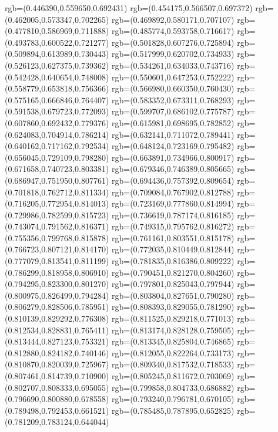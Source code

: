 {{{			rgb=(0.446390,0.559650,0.692431)
			rgb=(0.454175,0.566507,0.697372)
			rgb=(0.462005,0.573347,0.702265)
			rgb=(0.469892,0.580171,0.707107)
			rgb=(0.477810,0.586969,0.711888)
			rgb=(0.485774,0.593758,0.716617)
			rgb=(0.493783,0.600522,0.721277)
			rgb=(0.501828,0.607276,0.725894)
			rgb=(0.509894,0.613989,0.730443)
			rgb=(0.517999,0.620702,0.734933)
			rgb=(0.526123,0.627375,0.739362)
			rgb=(0.534261,0.634033,0.743716)
			rgb=(0.542428,0.640654,0.748008)
			rgb=(0.550601,0.647253,0.752222)
			rgb=(0.558779,0.653818,0.756366)
			rgb=(0.566980,0.660350,0.760430)
			rgb=(0.575165,0.666846,0.764407)
			rgb=(0.583352,0.673311,0.768293)
			rgb=(0.591538,0.679723,0.772093)
			rgb=(0.599707,0.686102,0.775787)
			rgb=(0.607860,0.692432,0.779376)
			rgb=(0.615981,0.698695,0.782852)
			rgb=(0.624083,0.704914,0.786214)
			rgb=(0.632141,0.711072,0.789441)
			rgb=(0.640162,0.717162,0.792534)
			rgb=(0.648124,0.723169,0.795482)
			rgb=(0.656045,0.729109,0.798280)
			rgb=(0.663891,0.734966,0.800917)
			rgb=(0.671658,0.740723,0.803381)
			rgb=(0.679346,0.746389,0.805665)
			rgb=(0.686947,0.751950,0.807761)
			rgb=(0.694436,0.757392,0.809654)
			rgb=(0.701818,0.762712,0.811334)
			rgb=(0.709084,0.767902,0.812788)
			rgb=(0.716205,0.772954,0.814013)
			rgb=(0.723169,0.777860,0.814994)
			rgb=(0.729986,0.782599,0.815723)
			rgb=(0.736619,0.787174,0.816185)
			rgb=(0.743074,0.791562,0.816371)
			rgb=(0.749315,0.795762,0.816272)
			rgb=(0.755356,0.799768,0.815878)
			rgb=(0.761161,0.803551,0.815178)
			rgb=(0.766723,0.807121,0.814170)
			rgb=(0.772035,0.810449,0.812844)
			rgb=(0.777079,0.813541,0.811199)
			rgb=(0.781835,0.816386,0.809222)
			rgb=(0.786299,0.818958,0.806910)
			rgb=(0.790451,0.821270,0.804260)
			rgb=(0.794295,0.823300,0.801270)
			rgb=(0.797801,0.825043,0.797944)
			rgb=(0.800975,0.826499,0.794284)
			rgb=(0.803804,0.827651,0.790280)
			rgb=(0.806279,0.828506,0.785951)
			rgb=(0.808393,0.829055,0.781290)
			rgb=(0.810139,0.829292,0.776308)
			rgb=(0.811525,0.829218,0.771013)
			rgb=(0.812534,0.828831,0.765411)
			rgb=(0.813174,0.828128,0.759505)
			rgb=(0.813444,0.827123,0.753321)
			rgb=(0.813345,0.825804,0.746865)
			rgb=(0.812880,0.824182,0.740146)
			rgb=(0.812055,0.822264,0.733173)
			rgb=(0.810870,0.820039,0.725967)
			rgb=(0.809340,0.817532,0.718533)
			rgb=(0.807461,0.814739,0.710900)
			rgb=(0.805245,0.811672,0.703069)
			rgb=(0.802707,0.808333,0.695055)
			rgb=(0.799858,0.804733,0.686882)
			rgb=(0.796690,0.800880,0.678558)
			rgb=(0.793240,0.796781,0.670105)
			rgb=(0.789498,0.792453,0.661521)
			rgb=(0.785485,0.787895,0.652825)
			rgb=(0.781209,0.783124,0.644044)
}}}
